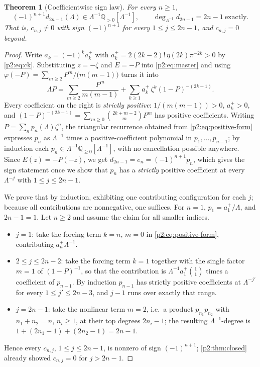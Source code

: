 \documentclass[11pt,a4paper,oneside]{book}
\theoremstyle{plain}
\newtheorem{theorem}{Theorem}[chapter]
\theoremstyle{definition}
\theoremstyle{remark}
\newcommand{\Rat}{\mathbb{Q}}
\begin{document}
\begin{theorem}[Coefficientwise sign law]
\label{p2:thm:sign-law}
For every \(n\ge1\),
\begin{equation}
 (-1)^{n+1}d_{2n-1}(\Lambda)\in\Lambda^{-1}\Rat_{>0}[\Lambda^{-1}],
 \qquad
 \deg_{\Lambda^{-1}}d_{2n-1}=2n-1 \ \text{exactly}.
 \label{p2:eq:sign-law}
\end{equation}
That is, \(c_{n,j}\ne0\) with sign \((-1)^{n+1}\) for every
\(1\le j\le2n-1\), and \(c_{n,j}=0\) beyond.
\end{theorem}

\begin{proof}
Write \(a_k=(-1)^ka_k^+\) with
\(a_k^+=2(2k-2)!\,\eta(2k)\pi^{-2k}>0\) by \cref{p2:eq:ck}.  Substituting
\(z=-\zeta\) and \(E=-P\) into \cref{p2:eq:master} and using
\(\varphi(-P)=\sum_{m\ge2}P^m/\bigl(m(m-1)\bigr)\) turns it into
\begin{equation}
 \Lambda P=\sum_{m\ge2}\frac{P^m}{m(m-1)}
 +\sum_{k\ge1}a_k^+\,\zeta^k(1-P)^{-(2k-1)} .
 \label{p2:eq:positive-form}
\end{equation}
Every coefficient on the right is \emph{strictly positive}: \(1/(m(m-1))>0\),
\(a_k^+>0\), and \((1-P)^{-(2k-1)}=\sum_{m\ge0}\binom{2k+m-2}{m}P^m\) has
positive coefficients.  Writing \(P=\sum_np_n(\Lambda)\zeta^n\), the
triangular recurrence obtained from \cref{p2:eq:positive-form} expresses
\(p_n\) as \(\Lambda^{-1}\) times a positive-coefficient polynomial in
\(p_1,\dots,p_{n-1}\); by induction each \(p_n\in\Lambda^{-1}
\Rat_{\ge0}[\Lambda^{-1}]\), with no cancellation possible anywhere.  Since
\(E(z)=-P(-z)\), we get \(d_{2n-1}=e_n=(-1)^{n+1}p_n\), which gives the sign
statement once we show that \(p_n\) has a \emph{strictly} positive coefficient
at every \(\Lambda^{-j}\) with \(1\le j\le2n-1\).

We prove that by induction, exhibiting one contributing configuration for each
\(j\); because all contributions are nonnegative, one suffices.  For \(n=1\),
\(p_1=a_1^+/\Lambda\), and \(2n-1=1\).  Let \(n\ge2\) and assume the claim for
all smaller indices.
\begin{itemize}
\item \(j=1\): take the forcing term \(k=n\), \(m=0\) in
      \cref{p2:eq:positive-form}, contributing \(a_n^+\Lambda^{-1}\).
\item \(2\le j\le2n-2\): take the forcing term \(k=1\) together with the
      single factor \(m=1\) of \((1-P)^{-1}\), so that the contribution is
      \(\Lambda^{-1}a_1^+\binom{1}{1}\) times a coefficient of \(p_{n-1}\).
      By induction \(p_{n-1}\) has strictly positive coefficients at
      \(\Lambda^{-j'}\) for every \(1\le j'\le2n-3\), and
      \(j-1\) runs over exactly that range.
\item \(j=2n-1\): take the nonlinear term \(m=2\), i.e.\ a product
      \(p_{n_1}p_{n_2}\) with \(n_1+n_2=n\), \(n_i\ge1\), at their top degrees
      \(2n_i-1\); the resulting \(\Lambda^{-1}\)-degree is
      \(1+(2n_1-1)+(2n_2-1)=2n-1\).
\end{itemize}
Hence every \(c_{n,j}\), \(1\le j\le2n-1\), is nonzero of sign
\((-1)^{n+1}\); \cref{p2:thm:closed} already showed \(c_{n,j}=0\) for
\(j>2n-1\).
\end{proof}
\end{document}
